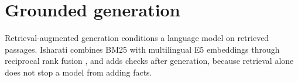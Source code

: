 \section{Grounded generation}
Retrieval-augmented generation \cite{rag} conditions a language model on retrieved passages. Isharati combines BM25
\cite{bm25} with multilingual E5 embeddings \cite{e5,me5} through reciprocal rank fusion \cite{rrf}, and adds checks after
generation, because retrieval alone does not stop a model from adding facts.
